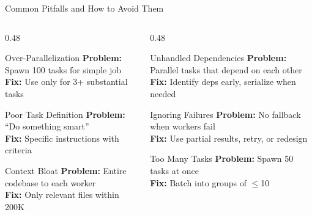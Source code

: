 \documentclass[aspectratio=169,11pt]{beamer}
\begin{document}
\begin{frame}{Common Pitfalls and How to Avoid Them}
\begin{columns}[T]
\begin{column}{0.48\textwidth}
\begin{alertblock}{Over-Parallelization}
\textbf{Problem:} Spawn 100 tasks for simple job\\
\textbf{Fix:} Use only for 3+ substantial tasks
\end{alertblock}

\begin{alertblock}{Poor Task Definition}
\textbf{Problem:} ``Do something smart''\\
\textbf{Fix:} Specific instructions with criteria
\end{alertblock}

\begin{alertblock}{Context Bloat}
\textbf{Problem:} Entire codebase to each worker\\
\textbf{Fix:} Only relevant files within 200K
\end{alertblock}
\end{column}
\begin{column}{0.48\textwidth}
\begin{alertblock}{Unhandled Dependencies}
\textbf{Problem:} Parallel tasks that depend on each other\\
\textbf{Fix:} Identify deps early, serialize when needed
\end{alertblock}

\begin{alertblock}{Ignoring Failures}
\textbf{Problem:} No fallback when workers fail\\
\textbf{Fix:} Use partial results, retry, or redesign
\end{alertblock}

\begin{alertblock}{Too Many Tasks}
\textbf{Problem:} Spawn 50 tasks at once\\
\textbf{Fix:} Batch into groups of $\leq$10
\end{alertblock}
\end{column}
\end{columns}
\end{frame}
\end{document}
